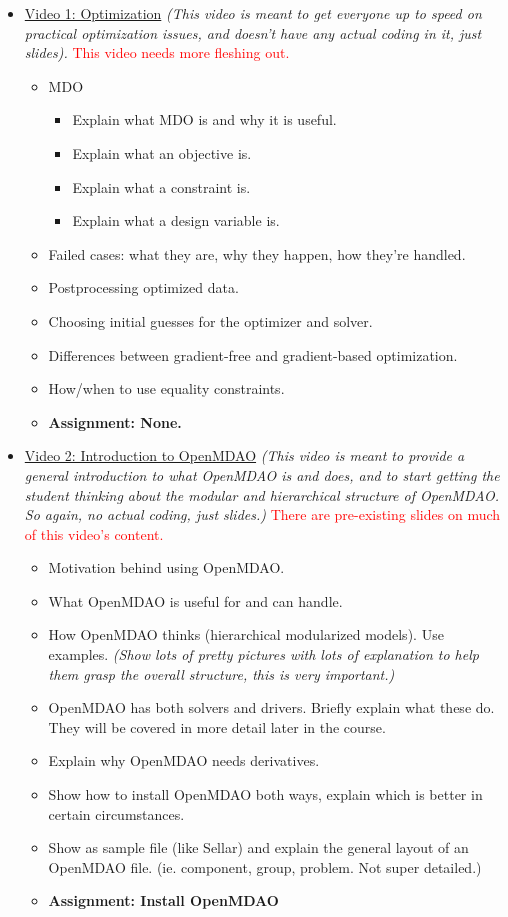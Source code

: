 \documentclass[12pt, letterpaper]{article}
\begin{document}
\begin{itemize}
	\item \underline{Video 1: Optimization} \textit{(This video is meant to get everyone up to speed on practical optimization issues, and doesn't have any actual coding in it, just slides).} \textcolor{red}{This video needs more fleshing out.}
		\begin{itemize}
			\item MDO
				\begin{itemize}
					\item Explain what MDO is and why it is useful.
					\item Explain what an objective is.
					\item Explain what a constraint is.
					\item Explain what a design variable is.
				\end{itemize}
			\item Failed cases: what they are, why they happen, how they're handled.
			\item Postprocessing optimized data.
			\item Choosing initial guesses for the optimizer and solver.
			\item Differences between gradient-free and gradient-based optimization.
			\item How/when to use equality constraints.
			\item \textbf{Assignment: None.}
		\end{itemize}

	\item \underline{Video 2: Introduction to OpenMDAO} \textit{(This video is meant to provide a general introduction to what OpenMDAO is and does, and to start getting the student thinking about the modular and hierarchical structure of OpenMDAO. So again, no actual coding, just slides.)} \textcolor{red}{There are pre-existing slides on much of this video's content.}
		\begin{itemize}
			\item Motivation behind using OpenMDAO.
			\item What OpenMDAO is useful for and can handle.
			\item How OpenMDAO thinks (hierarchical modularized models). Use examples. \textit{(Show lots of pretty pictures with lots of explanation to help them grasp the overall structure, this is very important.)}
			\item OpenMDAO has both solvers and drivers. Briefly explain what these do. They will be covered in more detail later in the course.
			\item Explain why OpenMDAO needs derivatives.
			\item Show how to install OpenMDAO both ways, explain which is better in certain circumstances.
			\item Show as sample file (like Sellar) and explain the general layout of an OpenMDAO file. (ie. component, group, problem. Not super detailed.)
			\item \textbf{Assignment: Install OpenMDAO}
		\end{itemize}


\end{itemize}
\end{document}

